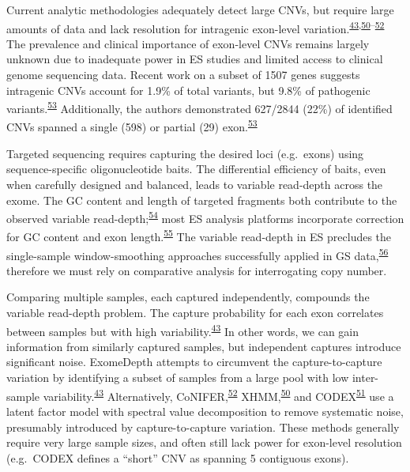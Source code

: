 \documentclass[11pt,letterpaper]{book}
\begin{document}
Current analytic methodologies adequately detect large CNVs, but require large amounts of data and lack resolution for intragenic exon-level variation.\textsuperscript{\protect\hyperlink{ref-plagnol:2012aa}{43},\protect\hyperlink{ref-fromer:2012aa}{50}--\protect\hyperlink{ref-krumm:2012aa}{52}}
The prevalence and clinical importance of exon-level CNVs remains largely unknown due to inadequate power in ES studies and limited access to clinical genome sequencing data.
Recent work on a subset of 1507 genes suggests intragenic CNVs account for 1.9\% of total variants, but 9.8\% of pathogenic variants.\textsuperscript{\protect\hyperlink{ref-truty:2019aa}{53}}
Additionally, the authors demonstrated 627/2844 (22\%) of identified CNVs spanned a single (598) or partial (29) exon.\textsuperscript{\protect\hyperlink{ref-truty:2019aa}{53}}

Targeted sequencing requires capturing the desired loci (e.g.~exons) using sequence-specific oligonucleotide baits.
The differential efficiency of baits, even when carefully designed and balanced, leads to variable read-depth across the exome.
The GC content and length of targeted fragments both contribute to the observed variable read-depth;\textsuperscript{\protect\hyperlink{ref-benjamini:2012aa}{54}} most ES analysis platforms incorporate correction for GC content and exon length.\textsuperscript{\protect\hyperlink{ref-kadalayil:2015aa}{55}}
The variable read-depth in ES precludes the single-sample window-smoothing approaches successfully applied in GS data,\textsuperscript{\protect\hyperlink{ref-chiang:2009aa}{56}} therefore we must rely on comparative analysis for interrogating copy number.

Comparing multiple samples, each captured independently, compounds the variable read-depth problem.
The capture probability for each exon correlates between samples but with high variability.\textsuperscript{\protect\hyperlink{ref-plagnol:2012aa}{43}}
In other words, we can gain information from similarly captured samples, but independent captures introduce significant noise.
ExomeDepth attempts to circumvent the capture-to-capture variation by identifying a subset of samples from a large pool with low inter-sample variability.\textsuperscript{\protect\hyperlink{ref-plagnol:2012aa}{43}}
Alternatively, CoNIFER,\textsuperscript{\protect\hyperlink{ref-krumm:2012aa}{52}} XHMM,\textsuperscript{\protect\hyperlink{ref-fromer:2012aa}{50}} and CODEX\textsuperscript{\protect\hyperlink{ref-jiang:2015aa}{51}} use a latent factor model with spectral value decomposition to remove systematic noise, presumably introduced by capture-to-capture variation.
These methods generally require very large sample sizes, and often still lack power for exon-level resolution (e.g.~CODEX defines a ``short'' CNV as spanning 5 contiguous exons).
\end{document}
